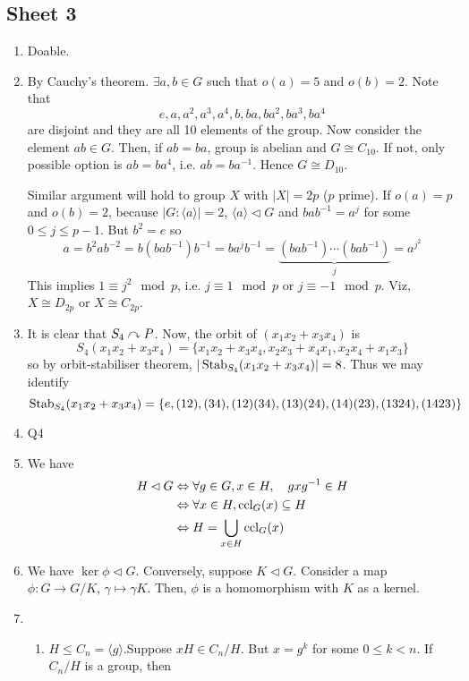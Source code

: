 \documentclass[10pt, a4paper, twoside]{report}
\begin{document}
\subsection{Sheet 3}
\begin{enumerate}[{1.}]
    \item Doable.
    \item By Cauchy's theorem. \(\exists a,b\in G\) such that \(o(a)=5\) and \(o(b)=2\). Note that 
    \[e,a,a^2,a^3,a^4,b,ba,ba^2,ba^3,ba^4\]
    are disjoint and they are all 10 elements of the group. Now consider the element \(ab\in G\). Then, if \(ab=ba\), group is abelian and \(G\cong C_{10}\). If not, only possible option is \(ab=ba^4\), i.e. \(ab=ba^{-1}\). Hence \(G\cong D_{10}\).
    
    Similar argument will hold to group \(X\) with \(|X|=2p\) (\(p\) prime). If \(o(a)=p\) and \(o(b)=2\), because \(|G:\langle a\rangle|=2\), \(\langle a\rangle\lhd G\) and \(bab^{-1}=a^j\) for some \(0\leq j\leq p-1\). But \(b^2=e\) so 
    \[a=b^2ab^{-2}=b(bab^{-1})b^{-1}=ba^jb^{-1}=\underbrace{(bab^{-1})\cdots(bab^{-1})}_{j}=a^{j^2}\]
    This implies \(1\equiv j^2\mod p\), i.e. \(j\equiv 1\mod p\) or \(j\equiv -1\mod p\).
    Viz, \(X\cong D_{2p}\) or \(X\cong C_{2p}\).
    \item It is clear that \(S_4\curvearrowright P\). Now, the orbit of \((x_1x_2+x_3x_4)\) is 
    \[S_4(x_1x_2+x_3x_4)=\{x_1x_2+x_3x_4,x_2x_3+x_4x_1,x_2x_4+x_1x_3\}\]
    so by orbit-stabiliser theorem, \(|\operatorname{Stab}_{S_4}(x_1x_2+x_3x_4)|=8\). Thus we may identify 
    \[\operatorname{Stab}_{S_4}(x_1x_2+x_3x_4)=\{e,(12),(34),(12)(34),(13)(24),(14)(23),(1324),(1423)\}\]
    \item Q4
    \item We have 
    \begin{align*}
        H\lhd G&\Leftrightarrow\forall g\in G,x\in H,\quad gxg^{-1}\in H \\
        &\Leftrightarrow \forall x\in H,\operatorname{ccl}_G(x)\subseteq H \\
        &\Leftrightarrow H=\bigcup_{x\in H}\operatorname{ccl}_G(x)
    \end{align*}
    \item We have \(\ker\phi\lhd G\). Conversely, suppose \(K\lhd G\). Consider a map \(\phi:G\to G/K\), \(\gamma\mapsto\gamma K\). Then, \(\phi\) is a homomorphism with \(K\) as a kernel.
    \item \begin{enumerate}[{(a)}]
        \item \(H\leq C_n=\langle g\rangle\).Suppose \(xH\in C_n/H\). But \(x=g^k\) for some \(0\leq k<n\). If \(C_n/H\) is a group, then 

\end{enumerate}
\end{enumerate}
\end{document}
